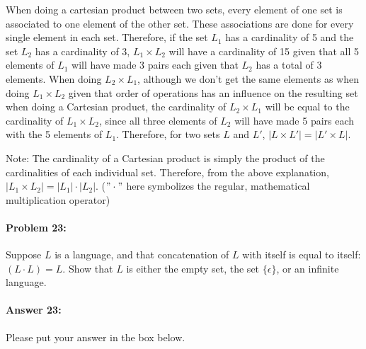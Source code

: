 \documentclass[10pt]{article}
\newenvironment{AnswerBox}{\begin{mdframed}[style=simple]}{\end{mdframed}}
\begin{document}
\begin{AnswerBox}%

When doing a cartesian product between two sets, every element of one set is associated to one element of the other set. These associations are done for every single element in each set. Therefore, if the set $L_1$ has a cardinality of 5 and the set $L_2$ has a cardinality of 3, $L_1 \times L_2$ will have a cardinality of 15 given that all 5 elements of $L_1$ will have made 3 pairs each given that $L_2$ has a total of 3 elements. When doing $L_2 \times L_1$, although we don't get the same elements as when doing $L_1 \times L_2$ given that order of operations has an influence on the resulting set when doing a Cartesian product, the cardinality of $L_2 \times L_1$ will be equal to the cardinality of $L_1 \times L_2$, since all three elements of $L_2$ will have made 5 pairs each with the 5 elements of $L_1$. Therefore, for two sets $L$ and $L'$, $|L \times L'| = |L' \times L|$.

Note: The cardinality of a Cartesian product is simply the product of the cardinalities of each individual set. Therefore, from the above explanation, $|L_1 \times L_2| = |L_1| \cdot |L_2|$. ($"\cdot"$ here symbolizes the regular, mathematical multiplication operator)
\end{AnswerBox}%

\noindent\hrulefill %

\paragraph{Problem 23:}

Suppose $L$ is a language, and that concatenation of $L$ with itself is equal to
itself: $(L\cdot L) = L$. Show that $L$ is either the empty set,  the set
$\{\epsilon\}$, or an infinite language.

\paragraph{Answer 23:} Please put your answer in the box below.
\end{document}
